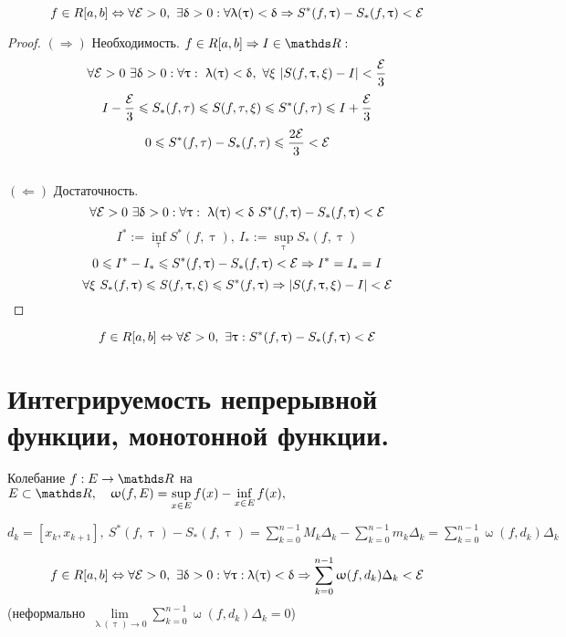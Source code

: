 \documentclass[12pt, fleqn]{article}
\begin{document}
\begin{Theorem} 
    \[f \in R[a,b] \Leftrightarrow \forall \mathcal{E} > 0,\ \exists \updelta > 0: \forall \uplambda(\uptau) < \updelta \Rightarrow S^*(f, \uptau)-S_*(f, \uptau)<\mathcal{E}\]
\end{Theorem}

\begin{proof}
    $(\Rightarrow)$ Необходимость. $f \in R[a,b] \Rightarrow I \in \R:$
    $$\forall \mathcal{E} > 0\ \exists \updelta > 0: \forall \uptau: \ \uplambda(\uptau) < \updelta,\ \forall \xi \ |S(f, \uptau, \xi) - I| < \frac{\mathcal{E}}{3}$$
    $$I-\frac{\mathcal{E}}{3} \leqslant S_*(f, \tau) \leqslant  S(f, \tau, \xi) \leqslant S^*(f, \tau) \leqslant  I+\frac{\mathcal{E}}{3}$$
    $$0 \leqslant S^*(f, \tau) - S_*(f, \tau) \leqslant \frac{2 \mathcal{E}}{3} < \mathcal{E}$$
    \\
    $(\Leftarrow)$ Достаточность. 
    $$\forall \E > 0\ \e \updelta > 0: \forall \uptau: \ \uplambda(\uptau) < \updelta\ S^*(f, \uptau)-S_*(f,\uptau) < \E$$
    $$I^*:=\inf\limits_\uptau S^*(f, \uptau), \ I_*:=\sup\limits_\uptau S_* (f, \uptau)$$
    $$0 \leqslant I^* - I_* \leqslant S^*(f, \uptau) - S_*(f, \uptau) < \mathcal{E} \Rightarrow I^*=I_*=I$$
    $$\forall \xi \ S_*(f, \uptau) \leqslant S(f, \uptau, \xi) \leqslant S^*(f, \uptau) \Rightarrow |S(f, \uptau, \xi) - I| < \mathcal{E}$$
\end{proof}

\begin{Theorem} 
    \[f \in R[a,b] \Leftrightarrow \forall \mathcal{E} > 0,\ \exists \uptau: S^*(f, \uptau)-S_*(f, \uptau) < \mathcal{E}\]
\end{Theorem}

\newpage
\section{Интегрируемость непрерывной функции, монотонной функции.}

\begin{definition}
    Колебание $f: E \rightarrow \R$ на $E \subset \R, \q \upomega(f, E)=\sup\limits_{x \in E} f(x) - \inf\limits_{x \in E} f(x),$ 
    
    $d_k=[x_k, x_{k+1}],\ S^*(f,\uptau)-S_*(f,\uptau)=\sum\limits_{k=0}^{n-1} M_k \Delta_k - \sum\limits_{k=0}^{n-1} m_k \Delta_k = \sum\limits_{k=0}^{n-1} \upomega(f, d_k) \Delta_k$
\end{definition}

\begin{Theorem} 
    \[f \in R [a,b] \lra \forall \E > 0,\ \e \updelta > 0: \forall \uptau: \uplambda(\uptau) < \updelta \Ra \sum\limits_{k=0}^{n-1} \upomega(f, d_k) \Delta_k < \E\]
    (неформально $\lim\limits_{\uplambda(\uptau) \rightarrow 0} \sum\limits_{k=0}^{n-1} \upomega(f,d_k) \Delta_k=0$)
\end{Theorem}
\end{document}
